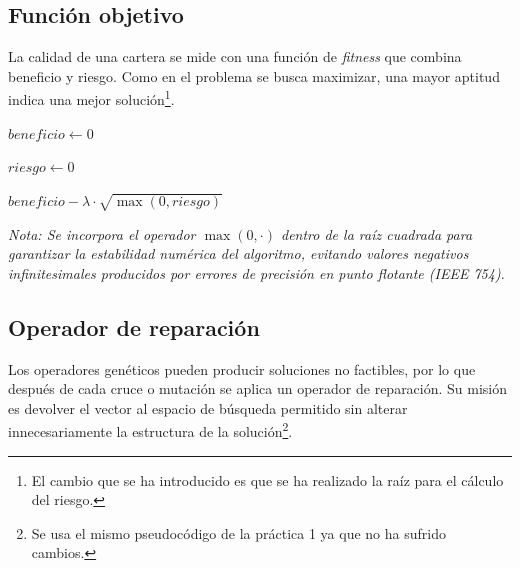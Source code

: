 \subsection{Función objetivo}
La calidad de una cartera se mide con una función de \textit{fitness} que combina beneficio y riesgo. Como en el problema se busca maximizar, una mayor aptitud indica una mejor solución\footnote{El cambio que se ha introducido es que se ha realizado la raíz para el cálculo del riesgo.}.

\begin{algorithm}[H]
\SetAlgoLined
{}

$beneficio \leftarrow 0$


$riesgo \leftarrow 0$


\Return $beneficio - \lambda \cdot \sqrt{\max(0, riesgo)}$
\caption{Evaluación de una solución}
\end{algorithm}
\textit{Nota: Se incorpora el operador $\max(0, \cdot)$ dentro de la raíz cuadrada para garantizar la estabilidad numérica del algoritmo, evitando valores negativos infinitesimales producidos por errores de precisión en punto flotante (IEEE 754).}

\subsection{Operador de reparación}
Los operadores genéticos pueden producir soluciones no factibles, por lo que después de cada cruce o mutación se aplica un operador de reparación. Su misión es devolver el vector al espacio de búsqueda permitido sin alterar innecesariamente la estructura de la solución\footnote{Se usa el mismo pseudocódigo de la práctica 1 ya que no ha sufrido cambios.}.

